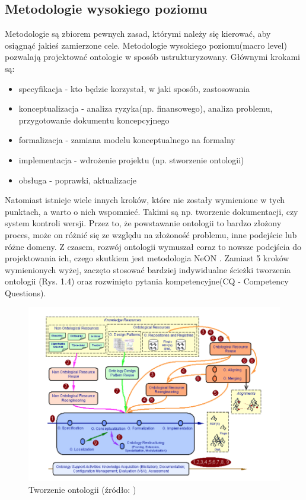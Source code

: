 \documentclass[a4paper,12pt, twoside]{book} %
\begin{document}
\subsection{Metodologie wysokiego poziomu}
Metodologie są zbiorem pewnych zasad, którymi należy się kierować, aby osiągnąć jakieś zamierzone cele.
Metodologie wysokiego poziomu(macro level) pozwalają projektować ontologie w sposób ustrukturyzowany. Głównymi krokami są:
\begin{itemize}
	\item specyfikacja - kto będzie korzystał, w jaki sposób, zastosowania
	\item konceptualizacja - analiza ryzyka(np. finansowego), analiza problemu, przygotowanie dokumentu koncepcyjnego \cite{kon}
	\item formalizacja - zamiana modelu konceptualnego na formalny
	\item implementacja - wdrożenie projektu (np. stworzenie ontologii)
	\item obsługa - poprawki, aktualizacje
\end{itemize}
Natomiast istnieje wiele innych kroków, które nie zostały wymienione w tych punktach, a warto o nich wspomnieć. Takimi są np. tworzenie dokumentacji, czy system kontroli wersji. Przez to, że powstawanie ontologii to bardzo złożony proces, może on różnić się ze względu na złożoność problemu, inne podejście lub różne domeny.
Z czasem, rozwój ontologii wymuszał coraz to nowsze podejścia do projektowania ich, czego skutkiem jest metodologia NeON \cite{C.MariaKeet.2020}. Zamiast 5 kroków wymienionych wyżej, zaczęto stosować bardziej indywidualne ścieżki tworzenia ontologii (Rys. 1.4) oraz rozwinięto pytania kompetencyjne(CQ - Competency Questions).
\begin{figure}[h]
	\centering
	\includegraphics[scale=0.75]{NeON.png}
	\caption{Tworzenie ontologii (źródło: \cite{NeON})}
\end{figure}
\end{document}

